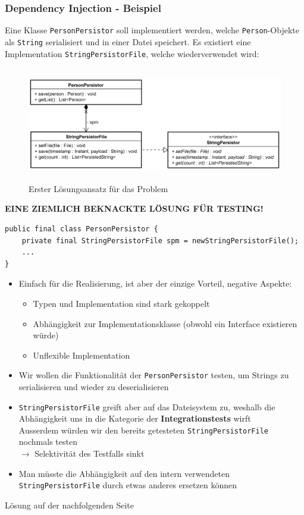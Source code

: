 \documentclass[a4paper]{article}
\begin{document}
			\subsubsection{Dependency Injection - Beispiel}
		
			Eine Klasse \texttt{PersonPersistor} soll implementiert werden, welche \texttt{Person}-Objekte als \texttt{String} serialisiert und in einer Datei speichert.
			Es existiert eine Implementation \texttt{StringPersistorFile}, welche wiederverwendet wird:
			
			\begin{figure}[!htb]
				\centering
				\includegraphics[keepaspectratio, height=5cm]{img/testing/di_01.png}
				\caption{Erster Lösungsansatz für das Problem}
				\label{fig:di_01}
			\end{figure}
			
			\textbf{EINE ZIEMLICH BEKNACKTE LÖSUNG FÜR TESTING!}\\
			
			\begin{lstlisting}
public final class PersonPersistor {
	private final StringPersistorFile spm = newStringPersistorFile();
	...
}
			\end{lstlisting}
			
			\begin{itemize}
				\item Einfach für die Realisierung, ist aber der einzige Vorteil, negative Aspekte:
					\begin{itemize}
					\item Typen und Implementation sind stark gekoppelt
					\item Abhängigkeit zur Implementationsklasse (obwohl ein Interface existieren würde)
					\item Unflexible Implementation
					\end{itemize}
				\item Wir wollen die Funktionalität der \texttt{PersonPersistor} testen, um Strings zu serialisieren und wieder zu deserialisieren
				\item \texttt{StringPersistorFile} greift aber auf das Dateisystem zu, weshalb die Abhängigkeit uns in die Kategorie der \textbf{Integrationstests} wirft\\
				Ausserdem würden wir den bereits getesteten \texttt{StringPersistorFile} nochmals testen\\
				$\rightarrow$ Selektivität des Testfalls sinkt
				\item Man müsste die Abhängigkeit auf den intern verwendeten \texttt{StringPersistorFile} durch etwas anderes ersetzen können
			\end{itemize}
			\vspace{1em}
			\noindent
			Lösung auf der nachfolgenden Seite
		
\end{document}
